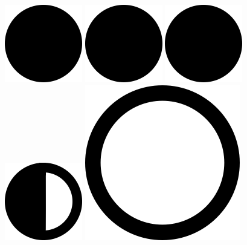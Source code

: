 \includegraphics[width=.40cm,height=.40cm]{images/rating/black_circle.png}
\hspace{0}
\includegraphics[width=.40cm,height=.40cm]{images/rating/black_circle.png}
\hspace{0}
\includegraphics[width=.40cm,height=.40cm]{images/rating/black_circle.png}
\hspace{0}
\includegraphics[width=.40cm,height=.40cm]{images/rating/Halfcircle.png}
\hspace{0}
\includegraphics[width=.40cm,height=.40cm]{images/rating/empty_circle.png}